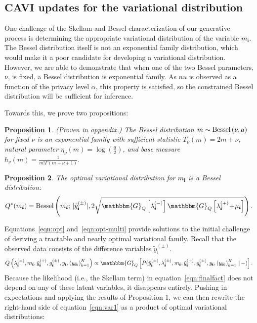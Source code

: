 \documentclass{article}
\newcommand{\subs}{\pmb{i}}
\newcommand{\wsup}[2]{#1_{\subs}^{(#2)}}
\newcommand{\ytP}{\wsup{\tilde{y}}{+}}
\newcommand{\ytPM}{\wsup{\tilde{y}}{\pm}}
\newcommand{\ysk}{y_{\subs k}}
\newcommand{\ys}{y_{\subs}}
\newcommand{\lamP}{\wsup{\lambda}{+}}
\newcommand{\lamM}{\wsup{\lambda}{-}}
\newcommand{\lamPM}{\wsup{\lambda}{\pm}}
\newcommand{\gPM}{\wsup{g}{\pm}}
\newcommand{\mus}{\mu_{\subs}}
\newcommand{\ms}{m_{\subs}}
\newcommand{\Bess}[1]{\textup{Bessel}\left( #1 \right)}
\newcommand{\Gq}[1]{\mathbbm{G}_Q\left[#1\right]}
\newcommand{\teq}{\!=\!}
\newcommand{\tp}{\!+\!}
\newtheorem{proposition}{Proposition}
\begin{document}
  \subsection{CAVI updates for the variational distribution}
  \label{sec:cavi}
  One challenge of the Skellam and Bessel characterization of our generative
  process is determining the appropriate variational distribution of the
  variable $\ms$. The Bessel distribution itself is not an exponential family
  distribution, which would make it a poor candidate for developing a
  variational distribution. However, we are able to demonstrate that when one of
  the two Bessel parameters, $\nu$, is fixed, a Bessel distribution is
  exponential family. As $nu$ is observed as a function of the privacy level
  $\alpha$, this property is satisfied, so the constrained Bessel distribution
  will be sufficient for inference.

  Towards this, we prove two propositions:
  
  \begin{proposition} (Proven in appendix.) The Bessel
  distribution $m \sim \Bess{\nu, a}$ for fixed $\nu$ is an exponential family
  with sufficient statistic $T_{\nu}(m) \teq 2m \tp \nu$, natural parameter
  $\eta_{\nu}(m)\teq \log(\frac{a}{2})$, and base measure $h_{\nu}(m) \teq
  \frac{1}{m!\Gamma(m\tp\nu\tp 1)}$. 
  \end{proposition}
  
  \begin{proposition} The optimal variational distribution for $\ms$ is a Bessel
  distribution:
  \begin{equation}
  \label{eqn:opt}
  Q^*(\ms) = \Bess{\ms; \, |\ytPM|, 2\sqrt{\Gq{\lamM}\Gq{\lamP \tp \mus}}}.
  \end{equation}
  \end{proposition}

  Equations~\ref{eqn:opt} and~\ref{eqn:opt-multi} provide solutions to the initial
  challenge of deriving a tractable and nearly optimal variational family.
  Recall that the observed data consists of the difference variables $\ytPM$.
  \begin{equation}
    \label{eqn:var1}
  Q \left( \lamPM, \ms, \ytP, \gPM, \ys, \left(\ysk\right)_{k=1}^K\right) \propto
   \Gq{P(\ytPM, \lamPM, \ms, \ytP, \gPM, \ys, \left(\ysk\right)_{k=1}^K \,|\,-)}.
  \end{equation}
  Because the likelihood (i.e., the Skellam term) in
  equation~\ref{eqn:finalfact} does not depend on any of these latent variables,
  it disappears entirely. Pushing in expectations and applying the results of
  Proposition 1, we can then rewrite the right-hand side of
  equation~\ref{eqn:var1} as a product of optimal variational distributions:
    
\end{document}

